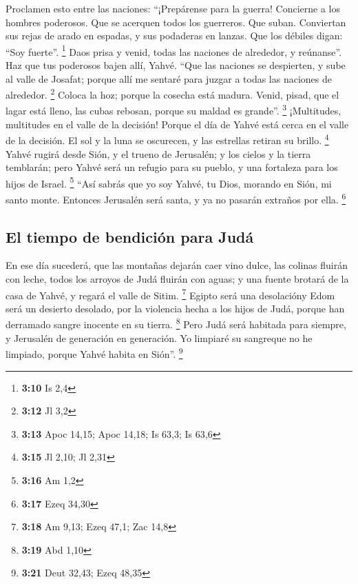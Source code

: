  Proclamen esto entre las naciones: ``¡Prepárense para la
guerra! Concierne a los hombres poderosos. Que se acerquen todos los
guerreros. Que suban.  Conviertan sus rejas de arado en
espadas, y sus podaderas en lanzas. Que los débiles digan: ``Soy
fuerte''. \footnote{\textbf{3:10} Is 2,4}  Daos prisa y
venid, todas las naciones de alrededor, y reúnanse''. Haz que tus
poderosos bajen allí, Yahvé.  ``Que las naciones se
despierten, y sube al valle de Josafat; porque allí me sentaré para
juzgar a todas las naciones de alrededor. \footnote{\textbf{3:12} Jl 3,2}
 Coloca la hoz; porque la cosecha está madura. Venid,
pisad, que el lagar está lleno, las cubas rebosan, porque su maldad es
grande''. \footnote{\textbf{3:13} Apoc 14,15; Apoc 14,18; Is 63,3; Is
  63,6}  ¡Multitudes, multitudes en el valle de la
decisión! Porque el día de Yahvé está cerca en el valle de la decisión.
 El sol y la luna se oscurecen, y las estrellas retiran
su brillo. \footnote{\textbf{3:15} Jl 2,10; Jl 2,31} 
Yahvé rugirá desde Sión, y el trueno de Jerusalén; y los cielos y la
tierra temblarán; pero Yahvé será un refugio para su pueblo, y una
fortaleza para los hijos de Israel. \footnote{\textbf{3:16} Am 1,2}
 ``Así sabrás que yo soy Yahvé, tu Dios, morando en Sión,
mi santo monte. Entonces Jerusalén será santa, y ya no pasarán extraños
por ella. \footnote{\textbf{3:17} Ezeq 34,30}

\hypertarget{el-tiempo-de-bendiciuxf3n-para-juduxe1}{%
\subsection{El tiempo de bendición para
Judá}\label{el-tiempo-de-bendiciuxf3n-para-juduxe1}}

 En ese día sucederá, que las montañas dejarán caer vino
dulce, las colinas fluirán con leche, todos los arroyos de Judá fluirán
con aguas; y una fuente brotará de la casa de Yahvé, y regará el valle
de Sitim. \footnote{\textbf{3:18} Am 9,13; Ezeq 47,1; Zac 14,8}
 Egipto será una desolacióny Edom será un desierto
desolado, por la violencia hecha a los hijos de Judá, porque han
derramado sangre inocente en su tierra. \footnote{\textbf{3:19} Abd 1,10}
 Pero Judá será habitada para siempre, y Jerusalén de
generación en generación.  Yo limpiaré su sangreque no he
limpiado, porque Yahvé habita en Sión''. \footnote{\textbf{3:21} Deut
  32,43; Ezeq 48,35}
